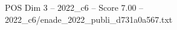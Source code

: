 \begin{textsample}{POS Dim 3 – 2022\_c6 – Score 7.00 – 2022\_c6/enade\_2022\_publi\_d731a0a567.txt}
\end{textsample}
